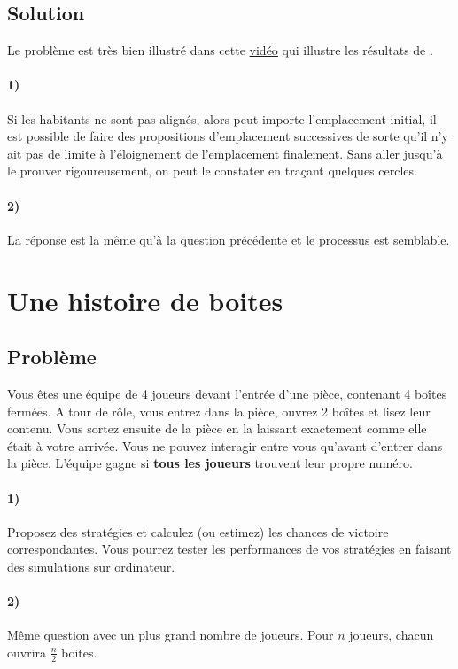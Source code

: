 \documentclass[a4paper,10pt,oneside]{article}
\begin{document}
\subsection{Solution}

Le problème est très bien illustré dans cette \href{https://www.youtube.com/watch?v=goQ4ii-zBMw}{vidéo} qui illustre les résultats de \cite{MCKELVEY1976472}.

\paragraph*{1)} 
Si les habitants ne sont pas alignés, alors peut importe l'emplacement initial, il est possible de faire des propositions d'emplacement successives de sorte qu'il n'y ait pas de limite à l'éloignement de l'emplacement finalement.
Sans aller jusqu'à le prouver rigoureusement, on peut le constater en traçant quelques cercles.

\paragraph*{2)}
La réponse est la même qu'à la question précédente et le processus est semblable.


\section{Une histoire de boites}

\subsection{Problème}
Vous êtes une équipe de 4 joueurs devant l'entrée d'une pièce, contenant 4 boîtes fermées.
A tour de rôle, vous entrez dans la pièce, ouvrez 2 boîtes et lisez leur contenu.
Vous sortez ensuite de la pièce en la laissant exactement comme elle était à votre arrivée. 
Vous ne pouvez interagir entre vous qu'avant d'entrer dans la pièce.
L'équipe gagne si \textbf{tous les joueurs} trouvent leur propre numéro. 



\paragraph*{1)}
Proposez des stratégies et calculez (ou estimez) les chances de victoire correspondantes.
Vous pourrez tester les performances de vos stratégies en faisant des simulations sur ordinateur.

\paragraph*{2)} Même question avec un plus grand nombre de joueurs. Pour $n$ joueurs, chacun ouvrira $\frac{n}{2}$ boites.
\end{document}
